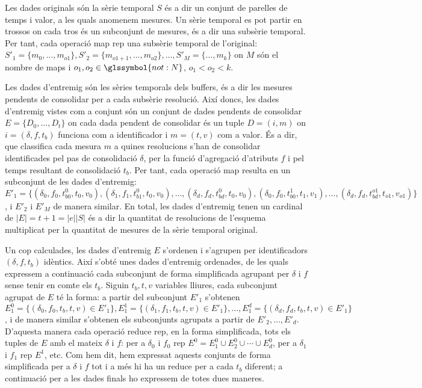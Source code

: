 





Les dades originals són la sèrie temporal $S$ és a dir un conjunt de
parelles de temps i valor, a les quals anomenem mesures. Un sèrie
temporal es pot partir en trossos on cada tros és un subconjunt de
mesures, és a dir una subsèrie temporal. Per tant, cada operació map
rep una subsèrie temporal de l'original: $S'_1 =
\{m_0,\dotsc,m_{o1}\}, S'_2 = \{m_{o1+1},\dotsc,m_{o2}\}, \dotsc, S'_M
= \{\dotsc,m_{k}\}$ on $M$ són el nombre de maps i $o_1,o_2\in
\glssymbol{not:N}$, $o_1 < o_2 < k$.



Les dades d'entremig són les sèries temporals dels buffers, és a dir
les mesures pendents de consolidar per a cada subsèrie resolució.
Així doncs, les dades d'entremig vistes com a conjunt són un conjunt
de dades pendents de consolidar $E=\{ D_{0}, \dotsc, D_t\}$ on cada
dada pendent de consolidar és un tuple $D=(i,m)$ on $i=(\delta,f,t_b)$
funciona com a identificador i $m=(t,v)$ com a valor.  És a dir, que
classifica cada mesura $m$ a quines resolucions s'han de consolidar
identificades pel pas de consolidació $\delta$, per la funció
d'agregació d'atributs $f$ i pel temps resultant de consolidació
$t_b$. Per tant, cada operació map resulta en un subconjunt de les
dades d'entremig: $E'_1=\{ (\delta_0,f_0, t_{b0}^0, t_0,v_0),
(\delta_1,f_1, t_{b1}^0, t_0,v_0), \dotsc , (\delta_d,f_d, t_{bd}^0,
t_0,v_0), (\delta_0,f_0, t_{b0}^1, t_1,v_1), \dotsc, (\delta_d,f_d,
t_{bd}^{o1}, t_{o1},v_{o1}) \}$, i $E'_2$ i $E'_M$ de manera similar.
En total, les dades d'entremig tenen un cardinal de $|E|=t+1=|e||S|$
és a dir la quantitat de resolucions de l'esquema multiplicat per la
quantitat de mesures de la sèrie temporal original.


Un cop calculades, les dades d'entremig $E$ s'ordenen i
s'agrupen per identificadors $(\delta,f, t_b)$ idèntics.  Així s'obté
unes dades d'entremig ordenades, de les quals expressem a continuació
cada subconjunt de forma simplificada agrupant per $\delta$ i $f$
sense tenir en comte els $t_b$. Siguin $ t_b, t,v$ variables lliures,
cada subconjunt agrupat de $E$ té la forma:
a partir del subconjunt $E'_1$ s'obtenen $E_1^0=\{ (\delta_0,f_0, t_b,
t,v) \in E'_1 \}, E_1^1=\{ (\delta_1,f_1, t_b, t,v) \in E'_1 \},
\dotsc, E_1^d=\{ (\delta_d,f_d, t_b, t,v) \in E'_1 \}$, i de manera
similar s'obtenen els subconjunts agrupats a partir de
$E'_2,\dotsc,E'_d$.  D'aquesta manera cada operació reduce rep, en la
forma simplificada, tots els tuples de $E$ amb el mateix $\delta$ i
$f$: per a $\delta_0$ i $f_0$ rep $E^0 = E_1^0 \cup E_2^0 \cup \dotsb
\cup E_d^0$, per a $\delta_1$ i $f_1$ rep $E^1$, etc.  Com hem dit,
hem expressat aquests conjunts de forma simplificada per a $\delta$ i
$f$ tot i a més hi ha un reduce per a cada $t_b$ diferent; a
continuació per a les dades finals ho expressem de totes dues maneres.



